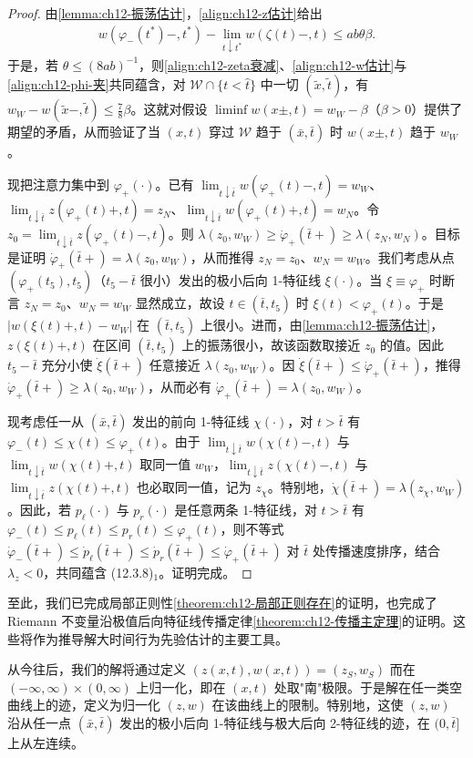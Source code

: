 \documentclass[../../main.tex]{subfiles}
\begin{document}
\begin{proof}
由\cref{lemma:ch12-振荡估计}，\eqref{align:ch12-z估计}给出
\begin{align}
w(\varphi_-(t^*)-,t^*)-\lim_{t\downarrow t^*}w(\zeta(t)-,t)\leqslant ab\theta\beta.
\label{align:ch12-w估计}
\end{align}
于是，若 $\theta\leqslant(8ab)^{-1}$，则\eqref{align:ch12-zeta衰减}、\eqref{align:ch12-w估计}与\eqref{align:ch12-phi-夹}共同蕴含，对 $\mathscr{W}\cap\{t<\hat t\}$ 中一切 $(\tilde x,\tilde t)$，有 $w_W-w(\tilde x-,\tilde t)\leqslant\frac78\beta$。这就对假设 $\liminf w(x\pm,t)=w_W-\beta$（$\beta>0$）提供了期望的矛盾，从而验证了当 $(x,t)$ 穿过 $\mathscr{W}$ 趋于 $(\bar x,\bar t)$ 时 $w(x\pm,t)$ 趋于 $w_W$。

现把注意力集中到 $\varphi_+(\cdot)$。已有 $\lim_{t\downarrow\bar t}w(\varphi_+(t)-,t)=w_W$、$\lim_{t\downarrow\bar t}z(\varphi_+(t)+,t)=z_N$、$\lim_{t\downarrow\bar t}w(\varphi_+(t)+,t)=w_N$。令 $z_0=\lim_{t\downarrow\bar t}z(\varphi_+(t)-,t)$。则 $\lambda(z_0,w_W)\geqslant\dot\varphi_+(\bar t+)\geqslant\lambda(z_N,w_N)$。目标是证明 $\dot\varphi_+(\bar t+)=\lambda(z_0,w_W)$，从而推得 $z_N=z_0$、$w_N=w_W$。我们考虑从点 $(\varphi_+(t_5),t_5)$（$t_5-\bar t$ 很小）发出的极小后向 1-特征线 $\xi(\cdot)$。当 $\xi\equiv\varphi_+$ 时断言 $z_N=z_0$、$w_N=w_W$ 显然成立，故设 $t\in(\bar t,t_5)$ 时 $\xi(t)<\varphi_+(t)$。于是 $|w(\xi(t)+,t)-w_W|$ 在 $(\bar t,t_5)$ 上很小。进而，由\cref{lemma:ch12-振荡估计}，$z(\xi(t)+,t)$ 在区间 $(\bar t,t_5)$ 上的振荡很小，故该函数取接近 $z_0$ 的值。因此 $t_5-\bar t$ 充分小使 $\dot\xi(\bar t+)$ 任意接近 $\lambda(z_0,w_W)$。因 $\dot\xi(\bar t+)\leqslant\dot\varphi_+(\bar t+)$，推得 $\dot\varphi_+(\bar t+)\geqslant\lambda(z_0,w_W)$，从而必有 $\dot\varphi_+(\bar t+)=\lambda(z_0,w_W)$。

现考虑任一从 $(\bar x,\bar t)$ 发出的前向 1-特征线 $\chi(\cdot)$，对 $t>\bar t$ 有 $\varphi_-(t)\leqslant\chi(t)\leqslant\varphi_+(t)$。由于 $\lim_{t\downarrow\bar t}w(\chi(t)-,t)$ 与 $\lim_{t\downarrow\bar t}w(\chi(t)+,t)$ 取同一值 $w_W$，$\lim_{t\downarrow\bar t}z(\chi(t)-,t)$ 与 $\lim_{t\downarrow\bar t}z(\chi(t)+,t)$ 也必取同一值，记为 $z_\chi$。特别地，$\dot\chi(\bar t+)=\lambda(z_\chi,w_W)$。因此，若 $p_\ell(\cdot)$ 与 $p_r(\cdot)$ 是任意两条 1-特征线，对 $t>\bar t$ 有 $\varphi_-(t)\leqslant p_\ell(t)\leqslant p_r(t)\leqslant\varphi_+(t)$，则不等式 $\dot\varphi_-(\bar t+)\leqslant\dot p_\ell(\bar t+)\leqslant\dot p_r(\bar t+)\leqslant\dot\varphi_+(\bar t+)$ 对 $\bar t$ 处传播速度排序，结合 $\lambda_z<0$，共同蕴含 (12.3.8)$_1$。证明完成。
\end{proof}

至此，我们已完成局部正则性\cref{theorem:ch12-局部正则存在}的证明，也完成了 Riemann 不变量沿极值后向特征线传播定律\cref{theorem:ch12-传播主定理}的证明。这些将作为推导解大时间行为先验估计的主要工具。

从今往后，我们的解将通过定义 $(z(x,t),w(x,t))=(z_S,w_S)$ 而在 $(-\infty,\infty)\times(0,\infty)$ 上归一化，即在 $(x,t)$ 处取"南"极限。于是解在任一类空曲线上的迹，定义为归一化 $(z,w)$ 在该曲线上的限制。特别地，这使 $(z,w)$ 沿从任一点 $(\bar x,\bar t)$ 发出的极小后向 1-特征线与极大后向 2-特征线的迹，在 $(0,\bar t]$ 上从左连续。
\end{document}
